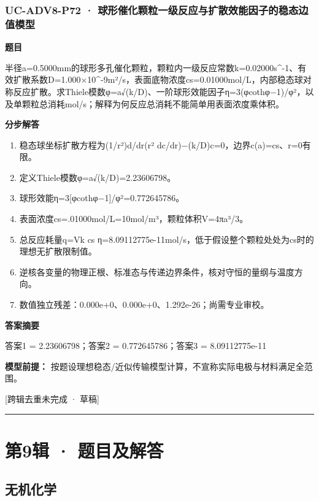 \documentclass[UTF8,11pt,a4paper]{ctexart}
\begin{document}
\subsubsection*{UC-ADV8-P72 · 球形催化颗粒一级反应与扩散效能因子的稳态边值模型}
\noindent\textbf{题目}\par
半径a=0.5000mm的球形多孔催化颗粒，颗粒内一级反应常数k=0.02000s\textasciicircum{}-1、有效扩散系数D=1.000×10\textasciicircum{}-9m²/s，表面底物浓度cs=0.01000mol/L，内部稳态球对称反应扩散。求Thiele模数φ=a√(k/D)、一阶球形效能因子η=3(φcothφ−1)/φ²，以及单颗粒总消耗mol/s；解释为何反应总消耗不能简单用表面浓度乘体积。\par
\medskip\noindent\textbf{分步解答}
\begin{enumerate}
\item 稳态球坐标扩散方程为(1/r²)d/dr(r² dc/dr)−(k/D)c=0，边界c(a)=cs、r=0有限。
\item 定义Thiele模数φ=a√(k/D)=2.23606798。
\item 球形效能η=3[φcothφ−1]/φ²=0.772645786。
\item 表面浓度cs=.01000mol/L=10mol/m³，颗粒体积V=4πa³/3。
\item 总反应耗量q=Vk cs η=8.09112775e-11mol/s，低于假设整个颗粒处处为cs时的理想无扩散限制值。
\item 逆核各变量的物理正根、标准态与传递边界条件，核对守恒的量纲与温度方向。
\item 数值独立残差：0.000e+0、0.000e+0、1.292e-26；尚需专业审校。
\end{enumerate}
\noindent\textbf{答案摘要}\par
答案1 = 2.23606798；答案2 = 0.772645786；答案3 = 8.09112775e-11\par
\noindent\textbf{模型前提：}
按题设理想稳态/近似传输模型计算，不宣称实际电极与材料满足全范围。\par
\noindent\textcolor{red!65!black}{[跨辑去重未完成 · 草稿]} \par
\medskip\hrule\medskip
\clearpage
\section*{第9辑 · 题目及解答}
\subsection*{无机化学}
\end{document}
